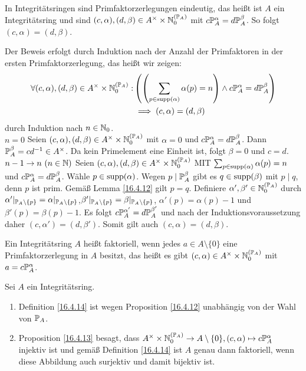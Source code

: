 \documentclass[../../main.tex]{subfiles}
\begin{document}
\begin{pro}\label{16.4.13}
In Integritätsringen sind Primfaktorzerlegungen eindeutig, das heißt ist $A$ ein Integritätsring und sind $(c,\alpha),(d,\beta)\in A^\times\times \N_0^{(\P_A)}$ mit $c\P_A^\alpha=d\P_A^\beta$. So folgt $(c,\alpha)=(d,\beta)$.
\end{pro}
\begin{cproof}
Der Beweis erfolgt durch Induktion nach der Anzahl der Primfaktoren in der ersten Primfaktorzerlegung, das heißt wir zeigen:
\begin{align*}
\forall (c,\alpha),(d,\beta)\in A^\times\times \N_0^{(\P_A)}:& \left(\left(\sum_{p\in\supp(\alpha)}\alpha(p)=n\right)\land c\P_A^{\alpha}=d\P_A^\beta\right)\\
&\implies (c,\alpha)=(d,\beta)
\end{align*}
durch Induktion nach $n\in \N_0$.\\

\noindent\underline{$n=0$} Seien $(c,\alpha),(d,\beta)\in A^\times\times \N_0^{(\P_A)}$ mit $\alpha=0$ und $c\P_A^\alpha=d\P_A^\beta$. Dann $\P_A^\beta=cd^{-1}\in A^\times$. Da kein Primelement eine Einheit ist, folgt $\beta=0$ und $c=d$.\\

\noindent\underline{$n-1\to n\ (n\in \N)$} Seien $(c,\alpha),(d,\beta)\in A^\times\times \N_0^{(\P_A)}$ MIT $\sum_{p\in\supp(\alpha)}\alpha(p)=n$ und $c\P_A^\alpha=d\P_A^\beta$. Wähle $p\in \supp(\alpha)$. Wegen $p\mid \P_A^\beta$ gibt es $q\in\supp(\beta)$ mit $p\mid q$, denn $p$ ist prim. Gemäß Lemma \ref{16.4.12} gilt $p=q$. Definiere $\alpha',\beta'\in\N_0^{(\P_A)}$ durch $\alpha'\vert_{\P_A\setminus\{p\}}=\alpha\vert_{\P_A\setminus\{p\}}$,$\beta'\vert_{\P_A\setminus\{p\}}=\beta\vert_{\P_A\setminus\{p\}}$, $\alpha'(p)=\alpha(p)-1$ und $\beta'(p)=\beta(p)-1$. Es folgt  $c\P_A^{\alpha'}=d\P_A^{\beta'}$ und nach der Induktionsvoraussetzung daher $(c,\alpha')=(d,\beta')$. Somit gilt auch $(c,\alpha)=(d,\beta)$.
\end{cproof}

\begin{df}\label{16.4.14}
Ein Integritätsring $A$ heißt faktoriell, wenn jedes $a\in A\setminus\{0\}$ eine Primfaktorzerlegung in $A$ besitzt, das heißt es gibt $(c,\alpha)\in A^\times\times \N_0^{(\P_A)}$ mit $a=c\P_A^\alpha$.
\end{df}

\begin{bem}\label{16.4.15}
Sei $A$ ein Integritätsring. 
\begin{enumerate}[\normalfont(a)]
\item Definition \ref{16.4.14} ist wegen Proposition \ref{16.4.12} unabhängig von der Wahl von $\P_A$.
\item Proposition \ref{16.4.13} besagt, dass  $A^\times\times \N_0^{(\P_A)}\to A\setminus\{0\}, (c,\alpha)\mapsto c\P_A^\alpha$ injektiv ist und gemäß Definition \ref{16.4.14} ist $A$ genau dann faktoriell, wenn diese Abbildung auch surjektiv und damit bijektiv ist.
\end{enumerate}
\end{bem}
\end{document}
